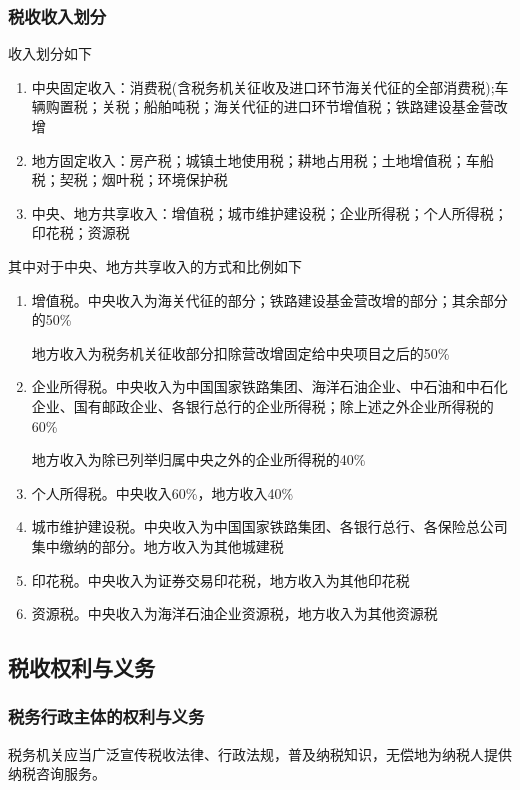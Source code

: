 \documentclass[UTF8,12pt]{ctexart}
\numberwithin{equation}{section} %
\numberwithin{figure}{section}
\numberwithin{table}{section}
\begin{document}
	\subsubsection{税收收入划分}
	收入划分如下
	\begin{enumerate}
		\item 中央固定收入：消费税(含税务机关征收及进口环节海关代征的全部消费税);车辆购置税；关税；船舶吨税；海关代征的进口环节增值税；铁路建设基金营改增
		
		\item 地方固定收入：房产税；城镇土地使用税；耕地占用税；土地增值税；车船税；契税；烟叶税；环境保护税
		
		\item 中央、地方共享收入：增值税；城市维护建设税；企业所得税；个人所得税；印花税；资源税
	\end{enumerate}
	
	其中对于中央、地方共享收入的方式和比例如下
	\begin{enumerate}
		\item 增值税。中央收入为海关代征的部分；铁路建设基金营改增的部分；其余部分的50\%
		
		地方收入为税务机关征收部分扣除营改增固定给中央项目之后的50\%
		
		\item 企业所得税。中央收入为中国国家铁路集团、海洋石油企业、中石油和中石化企业、国有邮政企业、各银行总行的企业所得税；除上述之外企业所得税的60\%
		
		地方收入为除已列举归属中央之外的企业所得税的40\%

		\item 个人所得税。中央收入60\%，地方收入40\%
		
		\item 城市维护建设税。中央收入为中国国家铁路集团、各银行总行、各保险总公司集中缴纳的部分。地方收入为其他城建税
		
		\item 印花税。中央收入为证券交易印花税，地方收入为其他印花税
		
		\item 资源税。中央收入为海洋石油企业资源税，地方收入为其他资源税
	\end{enumerate}
	
	\subsection{税收权利与义务}
	\subsubsection{税务行政主体的权利与义务}
	税务机关应当广泛宣传税收法律、行政法规，普及纳税知识，无偿地为纳税人提供纳税咨询服务。
	
\end{document}
